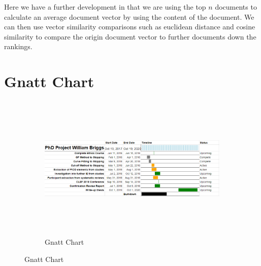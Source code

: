 Here we have a further development in that we are using the top $n$ documents to calculate an average document vector by using the content of the document. We can then use vector similarity comparisons such as euclidean distance and cosine similarity to compare the origin document vector to further documents down the rankings.



\section{Gnatt Chart}

\begin{figure}


\begin{figure}[H]
\center
\includegraphics[height=7cm]{figures/gnatt.png}
\caption{Gnatt Chart}
\end{figure}
\end{figure}


